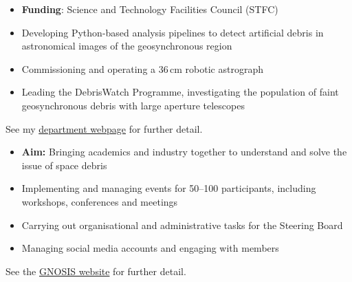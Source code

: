 \documentclass[10pt,a4paper]{altacv}
\begin{document}

\begin{fullwidth}
\makecvheader
\end{fullwidth}




\begin{itemize}
	\item \textbf{Funding}: Science and Technology Facilities Council (STFC)
	\item Developing Python-based analysis pipelines to detect artificial debris in astronomical images of the geosynchronous region
	\item Commissioning and operating a 36\,cm robotic astrograph 
	\item Leading the DebrisWatch Programme, investigating the population of faint geosynchronous debris with large aperture telescopes
\end{itemize}
\small See my \href{https://warwick.ac.uk/fac/sci/physics/research/astro/people/jamesblake/}{department webpage} for further detail.

\divider

\begin{itemize}
	\item \textbf{Aim:} Bringing academics and industry together to understand and solve the issue of space debris
	\item Implementing and managing events for 50--100 participants, including workshops, conferences and meetings
	\item Carrying out organisational and administrative tasks for the Steering Board
	\item Managing social media accounts and engaging with members
\end{itemize}
\small See the \href{https://gnosisnetwork.org/}{GNOSIS website} for further detail.
\end{document}
